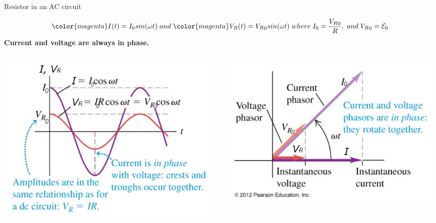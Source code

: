 \begin{frame}{Resistor in an AC circuit}

\begin{center}
{\scriptsize
\begin{equation*}
   {\color{magenta}  I(t) = I_0 sin(\omega t) } \; and \;
   {\color{magenta}  V_R(t) = {V_R}_0 sin(\omega t)} \;
   where \; I_0 = \frac{{V_R}_0}{R}, \; and \; {V_R}_0 = \mathcal{E}_0
\end{equation*}
}
{\color{magenta}
  {\bf Current and voltage are always in phase.}
}
\end{center}

\begin{columns}
  \begin{column}{0.50\textwidth}
    \begin{center}
       \includegraphics[width=0.98\textwidth]{./images/schematics/ac_resistor_graph.png}\\
     \end{center}
  \end{column}
  \begin{column}{0.50\textwidth}
    \begin{center}
       \includegraphics[width=0.98\textwidth]{./images/schematics/ac_resistor_phasor.png}\\
     \end{center}
  \end{column}
\end{columns}


\end{frame}
